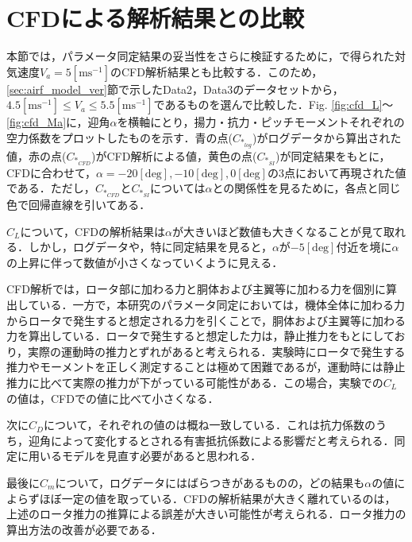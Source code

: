 \section{CFDによる解析結果との比較}
\label{sec:cfd}

本節では，パラメータ同定結果の妥当性をさらに検証するために，\cite{kawano}で得られた対気速度$V_a=5\mathrm{[m s^{-1}]}$のCFD解析結果とも比較する．このため，\ref{sec:airf_model_ver}節で示したData2，Data3のデータセットから，$4.5\mathrm{[m s^{-1}]} \leq V_a \leq 5.5\mathrm{[m s^{-1}]}$であるものを選んで比較した．Fig. \ref{fig:cfd_L}〜\ref{fig:cfd_Ma}に，迎角$\alpha$を横軸にとり，揚力・抗力・ピッチモーメントそれぞれの空力係数をプロットしたものを示す．青の点($C_{*_{log}}$)がログデータから算出された値，赤の点($C_{*_{CFD}}$)がCFD解析による値，黄色の点($C_{*_{SI}}$)が同定結果をもとに，CFDに合わせて，$\alpha=-20\mathrm{[deg]},-10\mathrm{[deg]},0\mathrm{[deg]}$の3点において再現された値である．ただし，$C_{*_{CFD}}$と$C_{*_{SI}}$については$\alpha$との関係性を見るために，各点と同じ色で回帰直線を引いてある．

$C_L$について，CFDの解析結果は$\alpha$が大きいほど数値も大きくなることが見て取れる．しかし，ログデータや，特に同定結果を見ると，$\alpha$が$-5\mathrm{[deg]}$付近を境に$\alpha$の上昇に伴って数値が小さくなっていくように見える．

CFD解析では，ロータ部に加わる力と胴体および主翼等に加わる力を個別に算出している．一方で，本研究のパラメータ同定においては，機体全体に加わる力からロータで発生すると想定される力を引くことで，胴体および主翼等に加わる力を算出している．ロータで発生すると想定した力は，静止推力をもとにしており，実際の運動時の推力とずれがあると考えられる．実験時にロータで発生する推力やモーメントを正しく測定することは極めて困難であるが，運動時には静止推力に比べて実際の推力が下がっている可能性がある．この場合，実験での$C_L$の値は，CFDでの値に比べて小さくなる．

次に$C_D$について，それぞれの値のは概ね一致している．これは抗力係数のうち，迎角によって変化するとされる有害抵抗係数による影響だと考えられる\cite{katou}．同定に用いるモデルを見直す必要があると思われる．

最後に$C_m$について，ログデータにはばらつきがあるものの，どの結果も$\alpha$の値によらずほぼ一定の値を取っている．CFDの解析結果が大きく離れているのは，上述のロータ推力の推算による誤差が大きい可能性が考えられる．ロータ推力の算出方法の改善が必要である．

